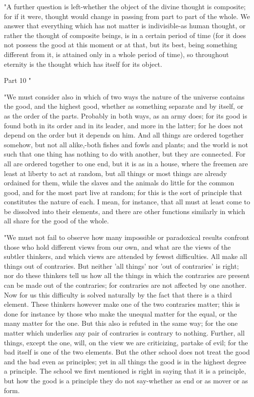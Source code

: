 "A further question is left-whether the object of the divine thought
is composite; for if it were, thought would change in passing from
part to part of the whole. We answer that everything which has not
matter is indivisible-as human thought, or rather the thought of composite
beings, is in a certain period of time (for it does not possess the
good at this moment or at that, but its best, being something different
from it, is attained only in a whole period of time), so throughout
eternity is the thought which has itself for its object.

Part 10 "

"We must consider also in which of two ways the nature of the universe
contains the good, and the highest good, whether as something separate
and by itself, or as the order of the parts. Probably in both ways,
as an army does; for its good is found both in its order and in its
leader, and more in the latter; for he does not depend on the order
but it depends on him. And all things are ordered together somehow,
but not all alike,-both fishes and fowls and plants; and the world
is not such that one thing has nothing to do with another, but they
are connected. For all are ordered together to one end, but it is
as in a house, where the freemen are least at liberty to act at random,
but all things or most things are already ordained for them, while
the slaves and the animals do little for the common good, and for
the most part live at random; for this is the sort of principle that
constitutes the nature of each. I mean, for instance, that all must
at least come to be dissolved into their elements, and there are other
functions similarly in which all share for the good of the whole.

"We must not fail to observe how many impossible or paradoxical results
confront those who hold different views from our own, and what are
the views of the subtler thinkers, and which views are attended by
fewest difficulties. All make all things out of contraries. But neither
'all things' nor 'out of contraries' is right; nor do these thinkers
tell us how all the things in which the contraries are present can
be made out of the contraries; for contraries are not affected by
one another. Now for us this difficulty is solved naturally by the
fact that there is a third element. These thinkers however make one
of the two contraries matter; this is done for instance by those who
make the unequal matter for the equal, or the many matter for the
one. But this also is refuted in the same way; for the one matter
which underlies any pair of contraries is contrary to nothing. Further,
all things, except the one, will, on the view we are criticizing,
partake of evil; for the bad itself is one of the two elements. But
the other school does not treat the good and the bad even as principles;
yet in all things the good is in the highest degree a principle. The
school we first mentioned is right in saying that it is a principle,
but how the good is a principle they do not say-whether as end or
as mover or as form. 

